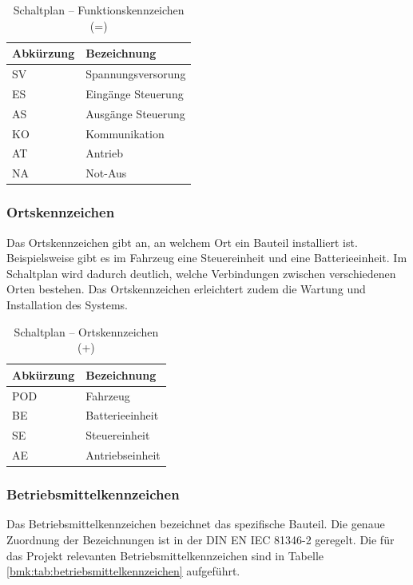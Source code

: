 \pagebreak[1]
\begin{table}[!ht]
	\centering
	\caption{Schaltplan – Funktionskennzeichen (=)}
	\label{BMK:tab:funktionskennzeichen}
	\begin{tabular}{ll}
		\hline
		\textbf{Abkürzung}      & \textbf{Bezeichnung} \\ \hline
		\multicolumn{1}{l|}{SV} & Spannungsversorung   \\
		\multicolumn{1}{l|}{ES} & Eingänge Steuerung   \\
		\multicolumn{1}{l|}{AS} & Ausgänge Steuerung   \\
		\multicolumn{1}{l|}{KO} & Kommunikation        \\
		\multicolumn{1}{l|}{AT} & Antrieb              \\
		\multicolumn{1}{l|}{NA} & Not-Aus              \\ \hline
	\end{tabular}
\end{table}
\pagebreak[1]

\subsubsection{Ortskennzeichen}
Das Ortskennzeichen gibt an, an welchem Ort ein Bauteil installiert ist. Beispielsweise gibt es im Fahrzeug eine Steuereinheit und eine Batterieeinheit. Im Schaltplan wird dadurch deutlich, welche Verbindungen zwischen verschiedenen Orten bestehen. Das Ortskennzeichen erleichtert zudem die Wartung und Installation des Systems.

\pagebreak[1]
\begin{table}[!ht]
	\centering
	\caption{Schaltplan – Ortskennzeichen (+)}
	\label{bmk:tab:ortskennzeichen}
	\begin{tabular}{ll}
		\hline
		\textbf{Abkürzung}       & \textbf{Bezeichnung} \\ \hline
		\multicolumn{1}{l|}{POD} & Fahrzeug             \\
		\multicolumn{1}{l|}{BE}  & Batterieeinheit      \\
		\multicolumn{1}{l|}{SE}  & Steuereinheit        \\
		\multicolumn{1}{l|}{AE}  & Antriebseinheit      \\ \hline
	\end{tabular}
\end{table}
\pagebreak[1]

\subsubsection{Betriebsmittelkennzeichen}
Das Betriebsmittelkennzeichen bezeichnet das spezifische Bauteil. Die genaue Zuordnung der Bezeichnungen ist in der DIN EN IEC 81346-2 geregelt. Die für das Projekt relevanten Betriebsmittelkennzeichen sind in Tabelle \ref{bmk:tab:betriebsmittelkennzeichen} aufgeführt.



